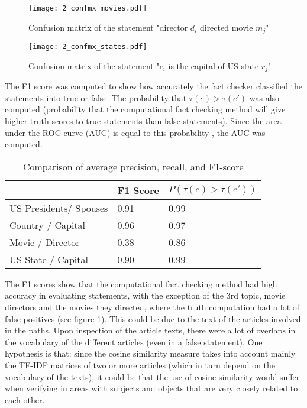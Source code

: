 \documentclass[10pt,11pt,12pt,oneside]{book}
\begin{document}
\begin{figure}[H]
	\begin{center}
		\texttt{[image: 2\_confmx\_movies.pdf]}\\
		\caption{Confusion matrix of the statement "director $ d_{i} $ directed movie $ m_{j} $"}
		\label{2_confmx_movies}
	\end{center}
\end{figure}

\begin{figure}[H]
	\begin{center}
		\texttt{[image: 2\_confmx\_states.pdf]}\\
		\caption{Confusion matrix of the statement "$ c_{i} $ is the capital of US state $ r_{j} $"}
	\end{center}
\end{figure}


The F1 score was computed to show how accurately the fact checker classified the statements into true or false. The probability that $ \tau (e) > \tau (e \prime) $ was also computed (probability that the computational fact checking method will give higher truth scores to true statements than false statements). Since the area under the ROC curve (AUC) is equal to this probability \cite{Fawcett2006}, the AUC was computed.\\

\begin{table}[H]
	\begin{tabular}{ | p{5cm} || p{4.8cm} | p{4.8cm} |}
		\hline
		& F1 Score & $ P (\tau (e) > \tau (e \prime)) $ \\
		\hline
		US Presidents/ Spouses & 0.91 & 0.99\\
		\hline
		Country / Capital & 0.96 & 0.97\\  
		\hline
		Movie / Director & 0.38 & 0.86\\
		\hline
		US State / Capital & 0.90 & 0.99\\
		\hline
	\end{tabular}
	\caption{Comparison of average precision, recall, and F1-score}
	\label{table_phase2}
\end{table}

The F1 scores show that the computational fact checking method had high accuracy in evaluating statements, with the exception of the 3rd topic, movie directors and the movies they directed, where the truth computation had a lot of false positives (see figure \ref{2_confmx_movies}). This could be due to the text of the articles involved in the paths. Upon inspection of the article texts, there were a lot of overlaps in the vocabulary of the different articles (even in a false statement). One hypothesis is that: since the cosine similarity measure takes into account mainly the TF-IDF matrices of two or more articles (which in turn depend on the vocabulary of the texts), it could be that the use of cosine similarity would suffer when verifying in areas with subjects and objects that are very closely related to each other.
\end{document}
